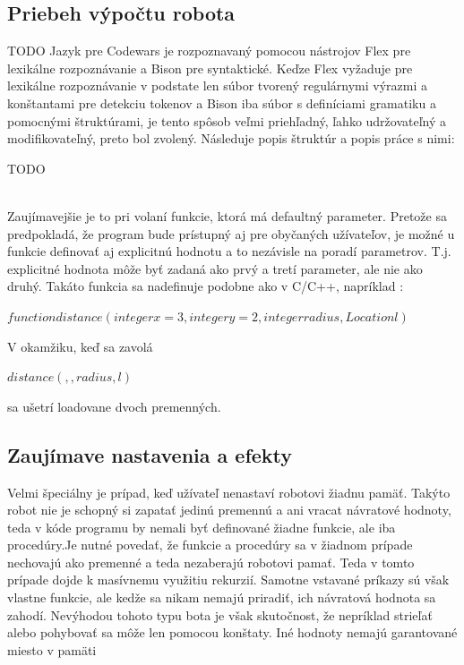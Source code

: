 \subsection{Priebeh výpočtu robota} %
TODO
Jazyk pre Codewars je rozpoznavaný pomocou nástrojov Flex pre lexikálne rozpoznávanie a Bison pre syntaktické. Keďze Flex vyžaduje pre lexikálne rozpoznávanie v podstate len súbor tvorený regulárnymi výrazmi a konštantami pre detekciu tokenov a Bison iba súbor s definíciami gramatiku a pomocnými štruktúrami, je tento spôsob veľmi priehľadný, ľahko udržovateľný a modifikovateľný, preto bol zvolený. Následuje popis štruktúr  a popis práce s nimi:
\begin{huge}TODO \end{huge}
\\
Zaujímavejšie je to pri volaní funkcie, ktorá má defaultný parameter. Pretože sa predpokladá, že program bude prístupný aj pre obyčaných užívateľov, je možné u funkcie definovať aj explicitnú hodnotu a to nezávisle na poradí parametrov. T.j. explicitné hodnota môže byť zadaná ako prvý a tretí parameter, ale nie ako druhý. Takáto funkcia sa nadefinuje podobne ako v C/C++, napríklad : \\\begin{center} $ function distance(integer x=3, integer y=2, integer radius, Location l) $ \\\end{center}V okamžiku, keď sa zavolá \begin{center} $ distance(, , radius,l) $ \end{center} sa ušetrí loadovane dvoch premenných.

\subsection{Zaujímave nastavenia a efekty}

Velmi špeciálny je prípad, keď užívateľ nenastaví robotovi žiadnu pamäť. Takýto robot nie je schopný si zapatať jedinú premennú a ani vracat návratové hodnoty, teda v kóde programu by nemali byť definované žiadne funkcie, ale iba procedúry.Je nutné povedať, že funkcie a procedúry sa v žiadnom prípade nechovajú ako premenné a teda nezaberajú robotovi pamať. Teda v tomto prípade dojde k masívnemu využitiu rekurzií. Samotne vstavané príkazy sú však vlastne funkcie, ale kedže sa nikam nemajú priradiť, ich návratová hodnota sa zahodí. Nevýhodou tohoto typu bota je však skutočnost, že  nepríklad strieľať alebo pohybovať sa môže len pomocou konštaty. Iné hodnoty nemajú garantované miesto v pamäti

